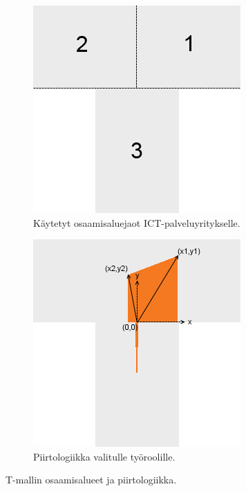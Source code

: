 \documentclass[a4paper,finnish,12pt]{article}
\begin{document}
\begin{figure}[!ht]
	\centering
	\begin{subfigure}[t]{0.45\textwidth}
		\includegraphics[width=\textwidth]{T_areas.png}
		\caption{Käytetyt osaamisaluejaot ICT-palveluyritykselle.}
		\label{fig:Tareas}
	\end{subfigure}
	\hfill
	\begin{subfigure}[t]{0.45\textwidth}
		\includegraphics[width=\textwidth]{T_drawing_logics.png}
		\caption{Piirtologiikka valitulle työroolille.}
		\label{fig:Tlogics}
	\end{subfigure}
	\caption{T-mallin osaamisalueet ja piirtologiikka.}
\end{figure}
\end{document}
